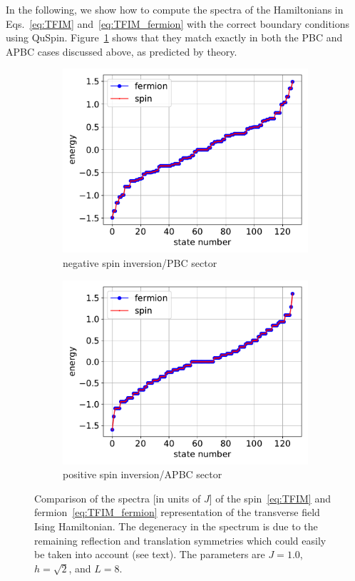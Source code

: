 \documentclass{SciPost}
\newcommand\0{\scalebox{-1}[1]{0}}
\begin{document}
In the following, we show how to compute the spectra of the Hamiltonians in Eqs.~\eqref{eq:TFIM} and~\eqref{eq:TFIM_fermion} with the correct boundary conditions using QuSpin. Figure~\ref{fig:JW} shows that they match exactly in both the PBC and APBC cases discussed above, as predicted by theory.

\begin{figure}[t!]
	\centering
	\begin{subfigure}[b]{0.496\textwidth}
		\includegraphics[width=\textwidth]{JW_PBC.pdf}
		\caption{negative spin inversion/PBC sector}
	\end{subfigure}
	\begin{subfigure}[b]{0.496\textwidth}
		\includegraphics[width=\textwidth]{JW_APBC.pdf}
		\caption{positive spin inversion/APBC sector}
	\end{subfigure}
	\caption{\label{fig:JW} Comparison of the spectra [in units of $J$] of the spin~\eqref{eq:TFIM} and fermion~\eqref{eq:TFIM_fermion} representation of the transverse field Ising Hamiltonian. The degeneracy in the spectrum is due to the remaining reflection and translation symmetries which could easily be taken into account (see text). The parameters are $J=1.0$, $h=\sqrt{2}$, and $L=8$.}  
\end{figure}
 
\end{document}
